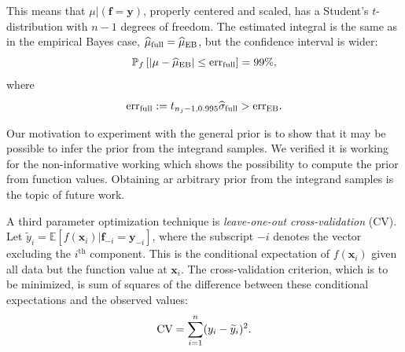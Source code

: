 \documentclass{iitthesis}          %
\newcommand{\bm}[1]{\boldsymbol{#1}}
\newcommand{\Ex}{\mathbb{E}}
\newcommand{\vf}{\bm{f}}
\newcommand{\vx}{\bm{x}}
\newcommand{\vy}{\bm{y}}
\newcommand{\hmu}{\widehat{\mu}}
\newcommand{\hsigma}{\widehat{\sigma}}
\newcommand{\MLE}{\textup{EB}}
\newcommand{\err}{\textup{err}}
\begin{document}
This means that $\mu \vert (\vf = \vy )$, properly centered and scaled, has a Student's $t$-distribution with $n-1$ degrees of freedom.   The estimated integral is the same as in the empirical Bayes case, $\hmu_{\textup{full}} = \hmu_{\MLE}$, but the confidence interval is wider:
\begin{equation*}
\mathbb{P}_f \left[
|\mu-\hmu_\MLE| \leq \err_{\textup{full}} \right]  = 99\%,
\end{equation*}
where
\begin{equation*}
\err_{\textup{full}} 
:= t_{n_j-1,0.995} \hsigma_{\textup{full}} > \err_\MLE .
\end{equation*}


\fi

Our motivation to experiment with the general prior is to show that it may be possible to infer the prior from the integrand samples. We verified it is working for the non-informative working which shows the possibility to compute the prior from function values. Obtaining ar arbitrary prior from the integrand samples is the topic of future work.


























 \label{sec:GCV}

A third parameter optimization technique is \emph{leave-one-out cross-validation} (CV).  Let $\widetilde{y}_i = \Ex[f(\vx_i ) | \vf_{-i} = \vy_{-i}]$, where the subscript $-i$ denotes the vector excluding the $i^{\text{th}}$ component.  This is the conditional expectation of $f(\vx_i )$ given all data but the function value at $\vx_i$.  The cross-validation criterion, which is to be minimized, is sum of squares of the difference between these conditional expectations and the observed values:
\begin{equation} \label{FJH:eq:CVA}
\textup{CV} = \sum_{i=1}^n (y_i - \widetilde{y}_i)^2.
\end{equation}
\end{document}
